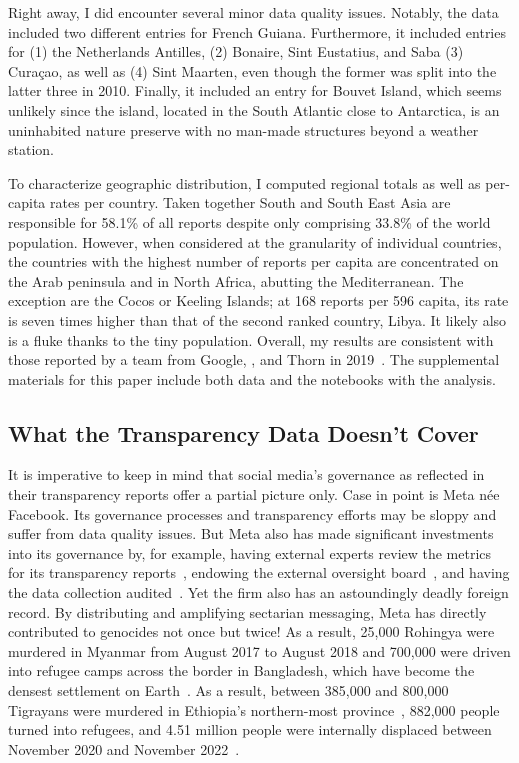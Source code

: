 Right away, I did encounter several minor data quality issues. Notably, the data
included two different entries for French Guiana. Furthermore, it included
entries for (1) the Netherlands Antilles, (2) Bonaire, Sint Eustatius, and Saba
(3) Curaçao, as well as (4) Sint Maarten, even though the former was split into
the latter three in 2010. Finally, it included an entry for Bouvet Island, which
seems unlikely since the island, located in the South Atlantic close to
Antarctica, is an uninhabited nature preserve with no man-made structures beyond
a weather station.

To characterize geographic distribution, I computed regional totals as well as
per-capita rates per country. Taken together South and South East Asia are
responsible for 58.1\% of all reports despite only comprising 33.8\% of the
world population. However, when considered at the granularity of individual
countries, the countries with the highest number of reports per capita are
concentrated on the Arab peninsula and in North Africa, abutting the
Mediterranean. The exception are the Cocos or Keeling Islands; at 168 reports
per 596 capita, its rate is seven times higher than that of the second ranked
country, Libya. It likely also is a fluke thanks to the tiny population.
Overall, my results are consistent with those reported by a team from Google,
\NCMEC, and Thorn in 2019~\cite{BurszteinBrightea2019}. The supplemental
materials for this paper include both data and the notebooks with the analysis.


\subsection{What the Transparency Data Doesn't Cover}
\label{sec:census:limits}

It is imperative to keep in mind that social media's governance as reflected in
their transparency reports offer a partial picture only. Case in point is Meta
n\'ee Facebook. Its governance processes and transparency efforts may be sloppy
and suffer from data quality issues. But Meta also has made significant
investments into its governance by, for example, having external experts review
the metrics for its transparency reports~\cite{BradfordGriselea2019}, endowing
the external oversight board~\cite{BoteroMarinoGreeneea2020}, and having the
data collection audited~\cite{Sarang2022}. Yet the firm also has an astoundingly
deadly foreign record. By distributing and amplifying sectarian messaging, Meta
has directly contributed to genocides not once but twice! As a result, 25,000
Rohingya were murdered in Myanmar from August 2017 to August 2018 and 700,000
were driven into refugee camps across the border in Bangladesh, which have
become the densest settlement on
Earth~\cite{DeGuzman2022,HumanRightsCouncil2018}. As a result, between 385,000
and 800,000 Tigrayans were murdered in Ethiopia's northern-most
province~\cite{AnnysVandenBemptea2021,ChothiaBekit2022}, 882,000 people turned
into refugees, and 4.51 million people were internally displaced between
November 2020 and November 2022~\cite{UNICEF2023}.


